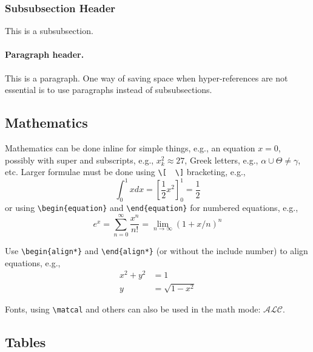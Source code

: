 \documentclass{easychair}
\begin{document}
\subsubsection{Subsubsection Header}
\label{sect:subsubsection-headings}

This is a subsubsection. 

\paragraph{Paragraph header.}

This is a paragraph. 
One way of saving space when hyper-references are not essential is to 
use paragraphs instead of subsubsections.

\subsection{Mathematics}
\label{sect:mathematics}

Mathematics can be done inline for simple things, e.g., an equation
$x = 0$, possibly with super and subscripts, e.g., $x^2_k \approx 27$,
Greek letters, e.g., $\alpha \cup \Theta \ne \gamma$, etc.
Larger formulae must be done using {\tt \verb|\|[}~~{\tt \verb|\|]}
bracketing, e.g.,
\[
\int_{0}^{1} x dx = \left[ \frac{1}{2}x^2 \right]_{0}^{1} = \frac{1}{2}
\]
or using {\tt \verb|\|begin\{equation\}} and {\tt \verb|\|end\{equation\}} for
numbered equations, e.g.,
\begin{equation}
e^x = \sum_{n=0}^\infty \frac{x^n}{n!} = \lim_{n\rightarrow\infty} (1+x/n)^n
\end{equation}

Use {\tt \verb|\|begin\{align*\}} and {\tt \verb|\|end\{align*\}} (or without
the {\tt *} include number) to align equations, e.g.,
\begin{align*}
x^2 + y^2 &= 1 \\
y &= \sqrt{1 - x^2}
\end{align*}

Fonts, using \verb|\matcal| and others can also be used in the math mode: $\mathcal{ALC}$.

\subsection{Tables}
\label{sect:tables}
\end{document}
